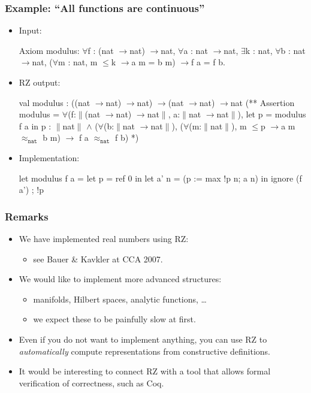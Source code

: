 \documentclass[t,handout]{beamer}
\newcommand{\iTo}{{\ensuremath{\to}}}
\newcommand{\iForall}{$\forall$}
\newcommand{\iAnd}{$\land$}
\newcommand{\iExists}{$\exists$}
\newcommand{\iT}[1]{$\|$#1$\|$}
\newcommand{\iPer}[1]{$\approx_{\mathtt{#1}}$}
\newcommand{\iLeq}{$\leq$}
\begin{document}
\begin{frame}[fragile]
  \frametitle{Example: ``All functions are continuous''}

  \begin{itemize}[<+->]
  \item 
    Input:
%
\begin{sourcex}
Axiom modulus:
\iForall f : (nat \iTo nat) \iTo nat, \iForall a : nat \iTo nat,
  \iExists k : nat, \iForall b : nat \iTo nat,
    (\iForall m : nat, m \iLeq k \iTo a m = b m) \iTo f a = f b.
\end{sourcex}
%
\item RZ output:
%
\begin{sourcex}
val modulus : ((nat \iTo nat) \iTo nat) \iTo (nat \iTo nat) \iTo nat
(**  Assertion modulus = 
  \iForall (f:\iT{(nat \iTo nat) \iTo nat}, a:\iT{nat \iTo nat}), 
    let p = modulus f a in p : \iT{nat} \iAnd 
    (\iForall (b:\iT{nat \iTo nat}), 
       (\iForall (m:\iT{nat}), m \iLeq p \iTo a m \iPer{nat} b m) \iTo
       f a \iPer{nat} f b) *)
\end{sourcex}
\item Implementation:
%
\begin{source}
let modulus f a =
  let p = ref 0 in
  let a' n = (p := max !p n; a n) in
    ignore (f a') ; !p
\end{source}
\end{itemize}


\end{frame}

\begin{frame}
  \frametitle{Remarks}

  \begin{itemize}
  \item We have implemented real numbers using RZ:
    \begin{itemize}[<.->]
    \item see Bauer \& Kavkler at CCA 2007.
    \end{itemize}
  \item We would like to implement more advanced structures:
    \begin{itemize}[<.->]
    \item manifolds, Hilbert spaces, analytic functions, \ldots
    \item we expect these to be painfully slow at first.
    \end{itemize}
  \item Even if you do not want to implement anything, you can use RZ
    to \emph{automatically} compute representations from constructive
    definitions.
  \item It would be interesting to connect RZ with a tool that allows
    formal verification of correctness, such as Coq.
  \end{itemize}

\end{frame}
\end{document}

